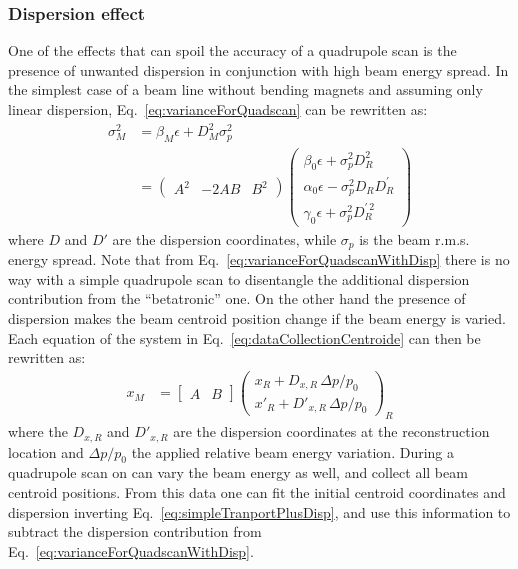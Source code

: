 \subsubsection{Dispersion effect}
%
One of the effects that can spoil the accuracy of a quadrupole scan is the
presence of unwanted dispersion in conjunction with high beam energy spread.
In the simplest case of a beam line without bending magnets and assuming
only linear dispersion, Eq.~\ref{eq:varianceForQuadscan} can be rewritten
as:
%
\begin{align}
 \sigma_M^2 &= 
 \beta_M \epsilon + D^2_{M} \sigma_p^2 \\
&=
 \begin{pmatrix}
  A^2 & -2AB & B^2 
  \end{pmatrix} 
\begin{pmatrix}
   \beta_0 \epsilon + \sigma_p^2 D_{R}^2 \\
   \alpha_0 \epsilon - \sigma_p^2 D_{R} D^{\prime}_{R} \\
   \gamma_0 \epsilon + \sigma_p^2 D_{R}^{\prime\,2} 
\end{pmatrix}
\label{eq:varianceForQuadscanWithDisp}
\end{align}
%
%
where $D$ and $D'$ are the dispersion coordinates, while $\sigma_p$ is the
beam r.m.s. energy spread. 
Note that from Eq.~\ref{eq:varianceForQuadscanWithDisp} there is no way with a
simple quadrupole scan to disentangle the additional dispersion contribution
from the ``betatronic'' one.
On the other hand the presence of dispersion makes the beam centroid position
change if the beam energy is varied. 
Each equation of the system in Eq.~\ref{eq:dataCollectionCentroide} can then
be rewritten as:
%
\begin{align}
x_M
&=
\begin{bmatrix}
A & B
\end{bmatrix}
\begin{pmatrix}
x_R + D_{x,R} \, \Delta p/p_0 \\
x'_R  + D'_{x,R} \, \Delta p/p_0
\end{pmatrix}_R
\label{eq:simpleTranportPlusDisp}
\end{align}
%
where the $D_{x,R}$ and $D'_{x,R}$ are the dispersion coordinates at the
reconstruction location and $\Delta p/p_0$ the applied relative beam energy
variation.
During a quadrupole scan on can vary the beam energy as well, and collect all
beam centroid positions.
From this data one can fit the initial centroid coordinates and dispersion
inverting Eq.~\ref{eq:simpleTranportPlusDisp}, and use this information to
subtract the dispersion contribution from
Eq.~\ref{eq:varianceForQuadscanWithDisp}.

